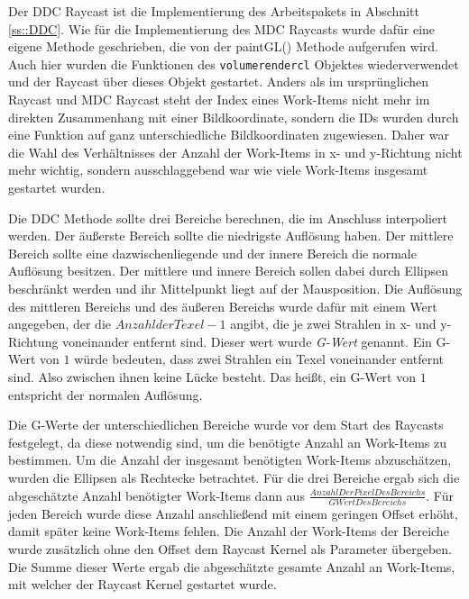 Der DDC Raycast ist die Implementierung des Arbeitspakets in Abschnitt \ref{ss::DDC}.
Wie für die Implementierung des MDC Raycasts wurde dafür eine eigene Methode geschrieben, die von der paintGL() Methode aufgerufen wird.
Auch hier wurden die Funktionen des \texttt{volumerendercl} Objektes wiederverwendet und der Raycast über dieses Objekt gestartet.
Anders als im ursprünglichen Raycast und MDC Raycast steht der Index eines Work-Items nicht mehr im direkten Zusammenhang mit einer Bildkoordinate, sondern die IDs wurden durch eine Funktion auf ganz unterschiedliche Bildkoordinaten zugewiesen.
Daher war die Wahl des Verhältnisses der Anzahl der Work-Items in x- und y-Richtung nicht mehr wichtig, sondern ausschlaggebend war wie viele Work-Items insgesamt gestartet wurden.

Die DDC Methode sollte drei Bereiche berechnen, die im Anschluss interpoliert werden.
Der äußerste Bereich sollte die niedrigste Auflösung haben.
Der mittlere Bereich sollte eine dazwischenliegende und der innere Bereich die normale Auflösung besitzen.
Der mittlere und innere Bereich sollen dabei durch Ellipsen beschränkt werden und ihr Mittelpunkt liegt auf der Mausposition.
Die Auflösung des mittleren Bereichs und des äußeren Bereichs wurde dafür mit einem Wert angegeben, der die $Anzahl der Texel - 1$ angibt, die je zwei Strahlen in x- und y-Richtung voneinander entfernt sind.
Dieser wert wurde \emph{G-Wert} genannt.
Ein G-Wert von $1$ würde bedeuten, dass zwei Strahlen ein Texel voneinander entfernt sind.
Also zwischen ihnen keine Lücke besteht.
Das heißt, ein G-Wert von $1$ entspricht der normalen Auflösung.

Die G-Werte der unterschiedlichen Bereiche wurde vor dem Start des Raycasts festgelegt, da diese notwendig sind, um die benötigte Anzahl an Work-Items zu bestimmen.
Um die Anzahl der insgesamt benötigten Work-Items abzuschätzen, wurden die Ellipsen als Rechtecke betrachtet.
Für die drei Bereiche ergab sich die abgeschätzte Anzahl benötigter Work-Items dann aus $\frac{AnzahlDerPixelDesBereichs}{GWertDesBereichs}$.
Für jeden Bereich wurde diese Anzahl anschließend mit einem geringen Offset erhöht, damit später keine Work-Items fehlen.
Die Anzahl der Work-Items der Bereiche wurde zusätzlich ohne den Offset dem Raycast Kernel als Parameter übergeben.
Die Summe dieser Werte ergab die abgeschätzte gesamte Anzahl an Work-Items, mit welcher der Raycast Kernel gestartet wurde.

